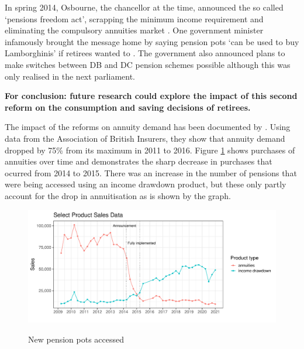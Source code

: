 \documentclass[12pt]{article}
\begin{document}
In spring 2014, Osbourne, the chancellor at the time, announced the so called
`pensions freedom act', scrapping the minimum income requirement and eliminating
the compulsory annuities market \citep{pen_freedoms_hmt_2014}. One government
minister infamously brought the message home by saying pension pots `can be used
to buy Lamborghinis' if retirees wanted to \citep{guardian_lambos}. The
government also announced plans to make switches between DB and DC pension
schemes possible although this was only realised in the next parliament.

\textbf{For conclusion: future research could explore the impact of this second reform on the
    consumption and saving decisions of retirees.}

The impact of the reforms on annuity demand has been documented by
\cite{cannon_et_al_nier_2016}. Using data from the Association of British
Insurers, they show that annuity demand dropped by 75\% from its maximum in
2011 to 2016. Figure \ref{fig:annovertime} shows
purchases of annuities over time and demonstrates the sharp decrease in purchases
that ocurred from 2014 to 2015. There was an increase in the number of pensions
that were being accessed using an income drawdown product, but these only partly
account for the drop in annuitisation as is shown by the graph.
\begin{figure}[h]

    \centering
    \includegraphics[width=0.9\columnwidth]{figures/annuity_overtime.pdf}
    \label{fig:annovertime}
    \caption{New pension pots accessed}
\end{figure}
\end{document}
